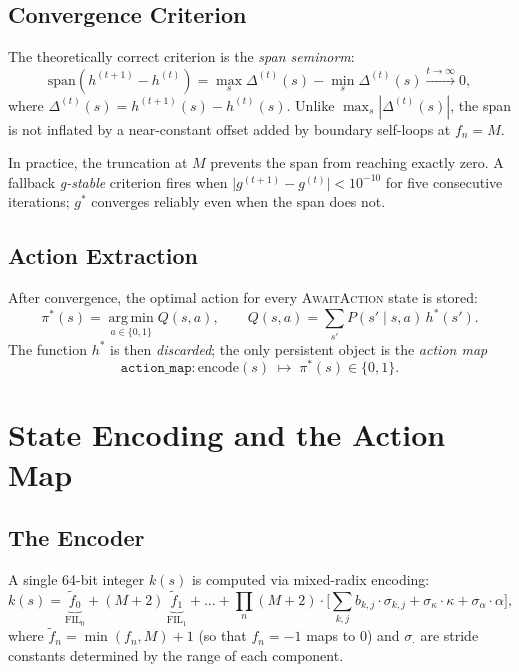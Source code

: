 \documentclass[11pt,a4paper]{article}
\begin{document}
\subsection{Convergence Criterion}

The theoretically correct criterion is the \emph{span seminorm}:
\[
  \text{span}\!\left(h^{(t+1)} - h^{(t)}\right)
    = \max_s \Delta^{(t)}(s) - \min_s \Delta^{(t)}(s)
    \xrightarrow{t\to\infty} 0,
\]
where $\Delta^{(t)}(s) = h^{(t+1)}(s) - h^{(t)}(s)$.  Unlike
$\max_s |\Delta^{(t)}(s)|$, the span is not inflated by a near-constant offset
added by boundary self-loops at $f_n = M$.

In practice, the truncation at $M$ prevents the span from reaching exactly
zero.  A fallback \emph{g-stable} criterion fires when
$\lvert g^{(t+1)} - g^{(t)} \rvert < 10^{-10}$ for five consecutive
iterations; $g^*$ converges reliably even when the span does not.

\subsection{Action Extraction}

After convergence, the optimal action for every \textsc{AwaitAction} state
is stored:
\begin{equation}
  \pi^*(s)
    = \operatorname*{arg\,min}_{a \in \{0,1\}}
      Q(s, a),
  \qquad
  Q(s, a) = \sum_{s'} P(s' \mid s, a)\, h^*(s').
  \label{eq:argmin}
\end{equation}
The function $h^*$ is then \emph{discarded}; the only persistent object
is the \emph{action map}
\[
  \texttt{action\_map} : \text{encode}(s) \;\mapsto\; \pi^*(s) \in \{0,1\}.
\]


\section{State Encoding and the Action Map}
\label{sec:encoding}

\subsection{The Encoder}

A single 64-bit integer $k(s)$ is computed via mixed-radix encoding:
\[
  k(s)
  = \underbrace{\tilde{f}_0}_{\text{FIL}_0}
    + (M{+}2)\,\underbrace{\tilde{f}_1}_{\text{FIL}_1}
    + \ldots
    + \prod_n (M{+}2)
      \cdot \biggl[
        \sum_{k,j} b_{k,j} \cdot \sigma_{k,j}
        + \sigma_\kappa \cdot \kappa
        + \sigma_\alpha \cdot \alpha
      \biggr],
\]
where $\tilde{f}_n = \min(f_n, M) + 1$ (so that $f_n = -1$ maps to 0) and
$\sigma_{\cdot}$ are stride constants determined by the range of each component.
\end{document}
